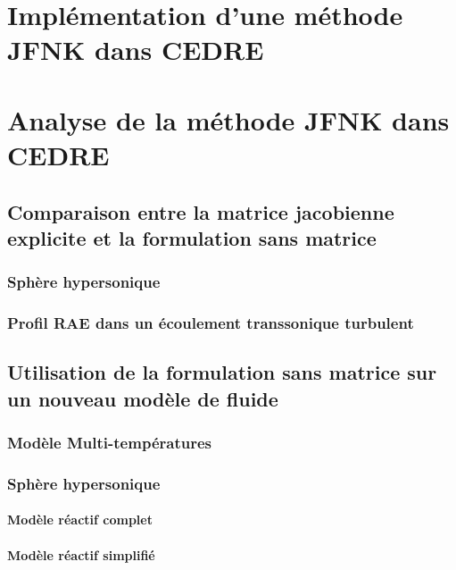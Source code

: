 


\maketitle
\tableofcontents
{}








\chapter{Implémentation d'une méthode JFNK dans CEDRE}

\chapter{Analyse de la méthode JFNK dans CEDRE}
  \section{Comparaison entre la matrice jacobienne explicite et la formulation sans matrice}
    \subsection{Sphère hypersonique}
    \subsection{Profil RAE dans un écoulement transsonique turbulent}
  \section{Utilisation de la formulation sans matrice sur un nouveau modèle de fluide}
    \subsection{Modèle Multi-températures}
    \subsection{Sphère hypersonique}
      \subsubsection{Modèle réactif complet}
      \subsubsection{Modèle réactif simplifié}


